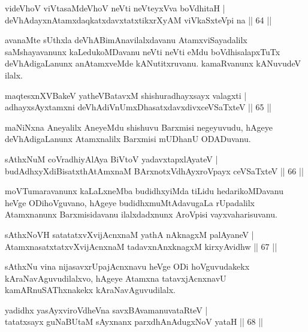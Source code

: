 \begin{shl}
videVhoV viVtasaMdeVhoV neVti neVteyxVva boVdhitaH |\\
deVhAdayxnAtamxdaqkatxdavxtatxtikxrXyAM viVkaSxteV\s pi na \hfill || 64 ||
\end{shl}

\begin{artha}
avanaMte sUthxla deVhABimAnavilalxdavanu AtamxviSayadalilx saMshayavanunx kaLedukoMDavanu neVti neVti eMdu boVdhisalapxTuTx deVhAdigaLanunx anAtamxveMde kANutitxruvanu. kamaRvanunx kANuvudeV ilalx.
\end{artha}

\begin{shl}
maqtesxnXVBakeV yatheVBatavxM shishuradhayxsayx valagxti |\\
adhayxsAyx\s \s tamxni deVhAdiVnUmxDhasatxdavxdivxceVSaTxteV \hfill || 65 ||
\end{shl}

\begin{artha}
maNiNxna Aneyalilx AneyeMdu shishuvu Barxmisi negeyuvudu, hAgeye deVhAdigaLanunx Atamxnalilx Barxmisi mUDhanU ODADuvanu.
\end{artha}

\begin{shl}
sAthxNuM coVradhiyA\s \s lAya BiVtoV yadavxtapxlAyateV |\\
budAdhxyXdiBisatxthA\s \s tAmxnaM BArxnotxV\s dhAyxroVpayx ceVSaTxteV \hfill || 66 ||
\end{shl}

\begin{artha}
moVTumaravanunx kaLaLxneMba budidhxyiMda tiLidu hedarikoMDavanu heVge ODihoVguvano, hAgeye budidhxmuMtAdavugaLa rUpadalilx Atamxnanunx Barxmisidavanu ilalxdadxnunx AroVpisi vayxvaharisuvanu.
\end{artha}

\begin{shl}
sAthxNoVH satatatxvXvijAcnxnaM yathA nAknagxM palAyaneV |\\
AtamxnasatxtatxvXvijAcnxnaM tadavxnAnxknagxM kirxyAvidhw \hfill || 67 ||
\end{shl}

\begin{artha}
sAthxNu vina nijasavxrUpajAcnxnavu heVge ODi hoVguvudakekx kAraNavAguvudilalxvo, hAgeye Atamxna tatavxjAcnxnavU kamARnuSAThxnakekx kAraNavAguvudilalx.
\end{artha}

\begin{shl}
yadidhx yasAyxviroVdheVna savxBAvamanuvataRteV |\\
tatatxsayx guNaBUtaM sAyxnanx parxdhAnAdugxNoV yataH \hfill || 68 ||
\end{shl}


